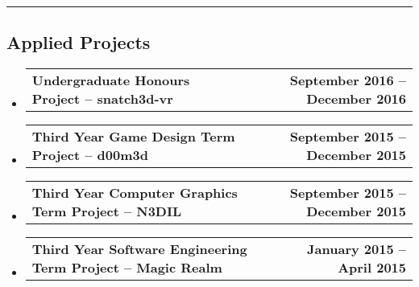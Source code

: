 \documentclass[10pt,letterpaper]{article}
\makeatletter
\newcommand{\headerrow}[2]
{\begin{tabular*}{\linewidth}{l@{\extracolsep{\fill}}r}
  #1 &
  #2 \\
\end{tabular*}}
\makeatother
\begin{document}
\hrule
\vspace{-0.4em}
\subsection*{Applied Projects}

\begin{itemize}
  \parskip=0.1em

  \item
  \headerrow
    {\textbf{Undergraduate Honours Project -- snatch3d-vr}}
    {\textbf{September 2016 -- December 2016}}

  \item
  \headerrow
    {\textbf{Third Year Game Design Term Project -- d00m3d}}
    {\textbf{September 2015 -- December 2015}}

  \item
  \headerrow
    {\textbf{Third Year Computer Graphics Term Project -- N3DIL}}
    {\textbf{September 2015 -- December 2015}}

  \item
  \headerrow
    {\textbf{Third Year Software Engineering Term Project -- Magic Realm}}
    {\textbf{January 2015 -- April 2015}}
\end{itemize}
\end{document}
